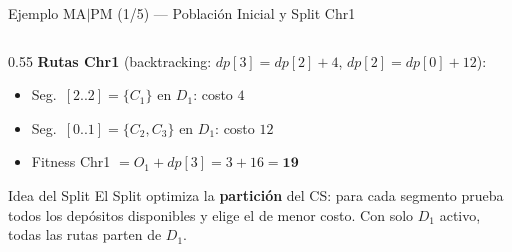 \documentclass[aspectratio=169,10pt]{beamer}
\begin{document}
\begin{frame}{Ejemplo MA$|$PM (1/5) --- Población Inicial y Split Chr1}
\begin{columns}[T,onlytextwidth]
\begin{column}{0.55\textwidth}
      \vspace{0.1em}
      \textbf{Rutas Chr1} (backtracking: $dp[3]{=}dp[2]{+}4$, $dp[2]{=}dp[0]{+}12$):
      \begin{itemize}\footnotesize
        \item Seg.\ $[2..2]{=}\{C_1\}$ en $D_1$: costo $4$
        \item Seg.\ $[0..1]{=}\{C_2,C_3\}$ en $D_1$: costo $12$
        \item Fitness Chr1 $= O_1 + dp[3] = 3+16 = \mathbf{19}$
      \end{itemize}

      \vspace{0.1em}
      \begin{block}{Idea del Split}\footnotesize
        El Split optimiza la \textbf{partición} del CS: para cada segmento prueba todos los depósitos disponibles y elige el de menor costo. Con solo $D_1$ activo, todas las rutas parten de $D_1$.
      \end{block}
    \end{column}
  \end{columns}
\end{frame}
\end{document}
